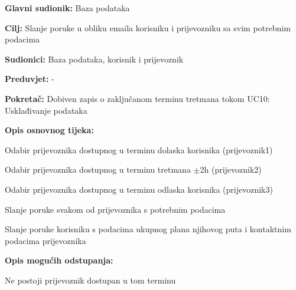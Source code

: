 					\noindent {}
					\begin{packed_item}
						
						\item \textbf{Glavni sudionik:} Baza podataka
						\item  \textbf{Cilj:} Slanje poruke u obliku emaila korisniku i prijevozniku sa svim potrebnim podacima
						\item  \textbf{Sudionici:} Baza podataka, korisnik i prijevoznik
						\item  \textbf{Preduvjet:} -
						\item  \textbf{Pokretač:} Dobiven zapis o zaključanom terminu tretmana tokom UC10: Usklađivanje podataka
						\item  \textbf{Opis osnovnog tijeka:}
						
						\item[] \begin{packed_enum}
							
							\item Odabir prijevoznika dostupnog u terminu dolaska korisnika \newline(prijevoznik1)
							\item Odabir prijevoznika dostupnog u terminu tretmana $\pm$2h \newline(prijevoznik2)
							\item Odabir prijevoznika dostupnog u terminu odlaska korisnika \newline(prijevoznik3)
							\item Slanje poruke svakom od prijevoznika s potrebnim podacima
							\item Slanje poruke korisniku s podacima ukupnog plana njihovog puta i kontaktnim podacima prijevoznika
							
						\end{packed_enum}
						
						\item  \textbf{Opis mogućih odstupanja:}
						
						\item[] \begin{packed_item}
							
							\item[1.a, 2.a i 3.a] Ne postoji prijevoznik dostupan u tom terminu
							\item[] \begin{packed_enum}
								

\end{packed_enum}
\end{packed_item}
\end{packed_item}
